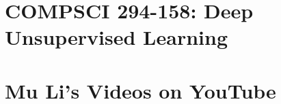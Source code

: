 \documentclass[openany]{book}
\begin{document}
\part{COMPSCI 294-158: Deep Unsupervised Learning}

\newpage

\newpage

\newpage

\newpage

\newpage

\newpage

\newpage

\newpage

\newpage

\newpage

\newpage

\newpage

\newpage

\newpage



\part{Mu Li's Videos on YouTube}



\end{document}
